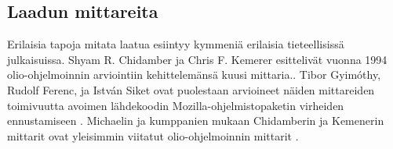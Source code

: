 \documentclass[finnish]{tktltiki2}
\theoremstyle{definition}
\theoremstyle{remark}
\begin{document}





\subsection{Laadun mittareita}

Erilaisia tapoja mitata laatua esiintyy kymmeniä erilaisia tieteellisissä julkaisuissa. Shyam R. Chidamber ja Chris F. Kemerer esittelivät vuonna 1994 olio-ohjelmoinnin arviointiin kehittelemänsä kuusi mittaria.\cite{Chidamber94}. Tibor Gyimóthy, Rudolf Ferenc, ja István Siket ovat puolestaan arvioineet näiden mittareiden toimivuutta avoimen lähdekoodin Mozilla-ohjelmistopaketin virheiden ennustamiseen \cite{Gyimothy05}. Michaelin ja kumppanien mukaan Chidamberin ja Kemenerin mittarit ovat yleisimmin viitatut olio-ohjelmoinnin mittarit \cite{Michael02}.

\end{document}
